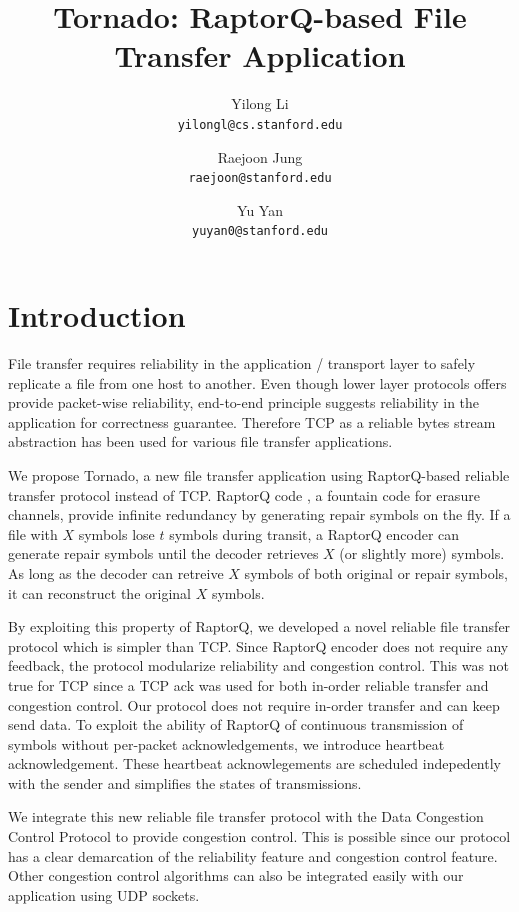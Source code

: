 \documentclass{sig-alternate-10pt}
\begin{document}
\title{Tornado: RaptorQ-based File Transfer Application} 
\author{ 
Yilong Li\\
\texttt{yilongl@cs.stanford.edu} \and 
Raejoon Jung\\
\texttt{raejoon@stanford.edu} \and 
Yu Yan\\ 
\texttt{yuyan0@stanford.edu} 
}

\maketitle 

\section{Introduction}
File transfer requires reliability in the application / transport layer to safely
replicate a file from one host to another. Even though lower layer protocols
offers provide packet-wise reliability, end-to-end principle suggests
reliability in the application for correctness guarantee. Therefore TCP as a
reliable bytes stream abstraction has been used for various file transfer
applications.

We propose Tornado, a new file transfer application using RaptorQ-based reliable
transfer protocol instead of TCP. RaptorQ code \cite{raptorq}, a fountain code
for erasure channels, provide infinite redundancy by generating repair symbols
on the fly. If a file with $X$ symbols lose $t$ symbols during transit, a
RaptorQ encoder can generate repair symbols until the decoder retrieves $X$ (or
slightly more) symbols. As long as the decoder can retreive $X$ symbols of both
original or repair symbols, it can reconstruct the original $X$ symbols.

By exploiting this property of RaptorQ, we developed a novel reliable file
transfer protocol which is simpler than TCP. Since RaptorQ encoder does not
require any feedback, the protocol modularize reliability and congestion
control. This was not true for TCP since a TCP ack was used for both in-order
reliable transfer and congestion control. Our protocol does not require in-order
transfer and can keep send data. To exploit the ability of RaptorQ of continuous
transmission of symbols without per-packet acknowledgements, we introduce
heartbeat acknowledgement. These heartbeat acknowlegements are scheduled
indepedently with the sender and simplifies the states of transmissions. 

We integrate this new reliable file transfer protocol with the Data Congestion
Control Protocol to provide congestion control. This is possible since our
protocol has a clear demarcation of the reliability feature and congestion
control feature. Other congestion control algorithms can also be integrated
easily with our application using UDP sockets.
\end{document}
